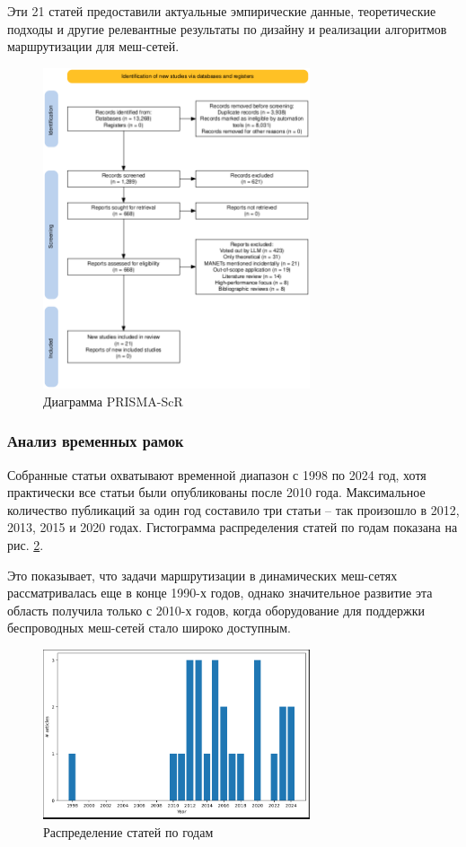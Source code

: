 \documentclass[%
]{report}
\begin{document}
Эти 21 статей предоставили актуальные эмпирические данные,
теоретические подходы и другие релевантные результаты
по дизайну и реализации алгоритмов маршрутизации для меш-сетей.

\begin{figure}[p]
\centering
\label{prisma}
\includegraphics[width=0.7\textwidth]{./assets/prisma.png}
\caption{Диаграмма PRISMA-ScR}
\end{figure}

\subsubsection{Анализ временных рамок}\label{timeframe-analysis}

Собранные статьи охватывают временной диапазон
с 1998 по 2024 год,
хотя практически все статьи были опубликованы после 2010 года.
Максимальное количество публикаций за один
год составило три статьи --
так произошло в 2012, 2013, 2015 и 2020 годах.
Гистограмма распределения статей по годам показана на рис. \ref{pic:years}.

Это показывает,
что задачи маршрутизации в динамических меш-сетях рассматривалась
еще в конце 1990-х годов,
однако значительное развитие эта область получила
только с 2010-х годов,
когда оборудование для поддержки беспроводных
меш-сетей стало широко доступным.

\begin{figure}[p]
\centering
\includegraphics[width=0.7\textwidth]{./assets/by-year.png}
\caption{Распределение статей по годам}
\label{pic:years}
\end{figure}
\end{document}
